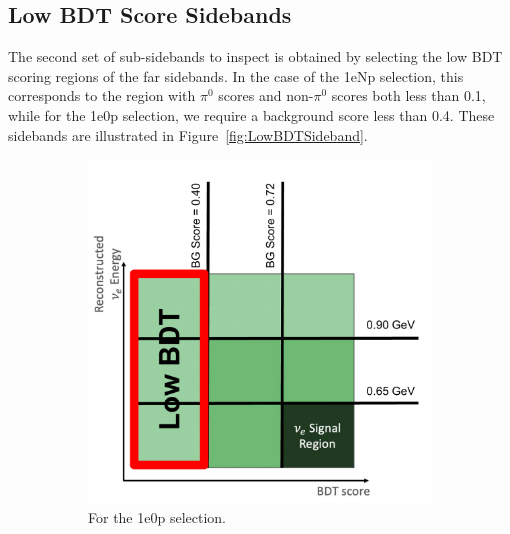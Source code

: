 \subsection{Low BDT Score Sidebands}
\label{sec:LowBDTScoreSidebands}

The second set of sub-sidebands to inspect is obtained by selecting the low BDT scoring regions of the far sidebands. In the case of the 1eNp selection, this corresponds to the region with $\pi^0$ scores and non-$\pi^0$ scores both less than 0.1, while for the 1e0p selection, we require a background score less than 0.4. These sidebands are illustrated in Figure~\ref{fig:LowBDTSideband}.

\begin{figure}[H]
    \centering
    \begin{subfigure}{0.5\linewidth}
        \includegraphics[width=\linewidth]{technote/Sidebands/Figures/FarSideband/ZpLowBDTSideband.pdf}
        \caption{For the 1e0p selection.}
    \end{subfigure}%
    \begin{subfigure}{0.5\linewidth}

\end{subfigure}
\end{figure}

